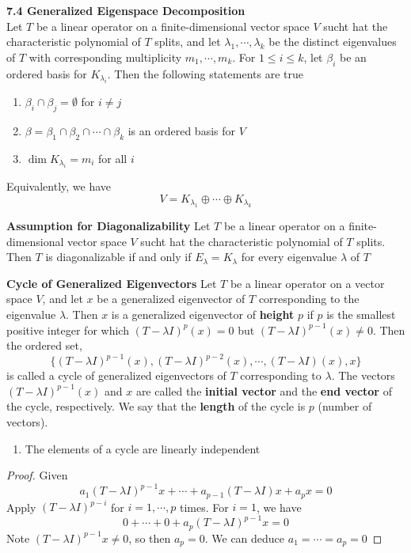 \documentclass[11pt]{article}
\begin{document}
\begin{theorem*}
    \textbf{7.4 Generalized Eigenspace Decomposition} \\
    Let $T$ be a linear operator on a finite-dimensional vector space $V$ sucht hat the characteristic polynomial of $T$ splits, and let $\lambda_1, \cdots, \lambda_k$ be the distinct eigenvalues of $T$ with corresponding multiplicity $m_1,\cdots, m_k$. For $1\leq i \leq k$, let $\beta_i$ be an ordered basis for $K_{\lambda_i}$. Then the following statements are true 
    \begin{enumerate}
        \item $\beta_i \cap \beta_j = \emptyset$ for $i\neq j$ 
        \item $\beta = \beta_1 \cap \beta_2 \cap \cdots \cap \beta_k$ is an ordered basis for $V$
        \item $\dim{K_{\lambda_i}} = m_i$ for all $i$
    \end{enumerate} 
    Equivalently, we have 
    \[
        V = K_{\lambda_1} \oplus \cdots \oplus K_{\lambda_k}    
    \]
\end{theorem*}

\begin{corollary*}
    \textbf{Assumption for Diagonalizability} Let $T$ be a linear operator on a finite-dimensional vector space $V$ sucht hat the characteristic polynomial of $T$ splits. Then $T$ is diagonalizable if and only if $E_{\lambda} = K_{\lambda}$ for every eigenvalue $\lambda$ of $T$
\end{corollary*}

\begin{defn*}
    \textbf{Cycle of Generalized Eigenvectors} Let $T$ be a linear operator on a vector space $V$, and let $x$ be a generalized eigenvector of $T$ corresponding to the eigenvalue $\lambda$. Then $x$ is a generalized eigenvector of \textbf{height} $p$ if $p$ is the smallest positive integer for which $(T-\lambda I)^p (x) = 0$ but $(T-\lambda I)^{p-1} (x) \neq 0$. Then the ordered set,
    \[
        \{ (T-\lambda I)^{p-1}(x), (T-\lambda I)^{p-2}(x), \cdots, (T-\lambda I)(x), x \}
    \]
    is called a cycle of generalized eigenvectors of $T$  corresponding to $\lambda$. The vectors $(T-\lambda I)^{p-1}(x)$ and $x$ are called the \textbf{initial vector} and the \textbf{end vector} of the cycle, respectively. We say that the \textbf{length} of the cycle is $p$ (number of vectors). 
    \begin{enumerate}
        \item The elements of a cycle are linearly independent
    \end{enumerate}
    \begin{proof}
        Given 
        \[
            a_1 (T-\lambda I)^{p-1} x + \cdots + a_{p-1}(T-\lambda I)    x + a_p x = 0
        \]
        Apply $(T-\lambda I)^{p-i}$ for $i = 1, \cdots, p$ times. For $i=1$, we have
        \[
            0 + \cdots + 0 + a_p (T-\lambda I)^{p-1}x = 0    
        \]
        Note $(T-\lambda I)^{p-1}x \neq 0$, so then $a_p = 0$. We can deduce $a_1 = \cdots = a_p = 0$
    \end{proof}
\end{defn*}
\end{document}
